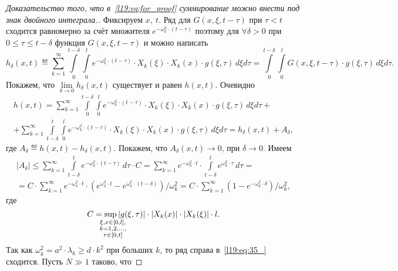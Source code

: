 \begin{proof}[Доказательство того, что в~\eqref{l19:eq:for_proof} суммирование можно внести под знак двойного интеграла.] Фиксируем $x,\ t$. Ряд для $G(x,\xi,t-\tau)$ при $\tau<t$ сходится равномерно за счёт множителя $\displaystyle e^{-\omega_k^2\cdot(t-\tau)}$ поэтому для $\forall\delta>0$ при $0\leqslant\tau\leqslant t-\delta$ функция $G(x,\xi,t-\tau)$ и можно написать
	\begin{equation*}
		h_{\delta}(x,t)\eqdef\sum\limits_{k=1}^{\infty}\int\limits_0^{t-\delta}\int\limits_0^l e^{-\omega_k^2\cdot(t-\tau)}\cdot X_k(\xi)\cdot X_k(x)\cdot g(\xi,\tau)\,d\xi d\tau=\int\limits_0^{t-\delta}\int\limits_0^l G(x,\xi,t-\tau)\cdot g(\xi,\tau)\,d\xi d\tau.
	\end{equation*}
	Покажем, что $\displaystyle\lim\limits_{\delta\to0}h_{\delta}(x,t)$ существует и равен $h(x,t)$. Очевидно 
	\begin{multline}\label{l19:eq:34_}
		h(x,t)=	\sum\limits_{k=1}^{\infty}\int\limits_0^{t-\delta}\int\limits_0^l e^{-\omega_k^2\cdot(t-\tau)}\cdot X_k(\xi)\cdot X_k(x)\cdot g(\xi,\tau)\,d\xi d\tau+\\
		+\sum\limits_{k=1}^{\infty}\int\limits_{t-\delta}^t\int\limits_0^l e^{-\omega_k^2\cdot(t-\tau)}\cdot X_k(\xi)\cdot X_k(x)\cdot g(\xi,\tau)\,d\xi d\tau=h_{\delta}(x,t)+A_{\delta},
	\end{multline}
	где $A_{\delta}\eqdef h(x,t)-h_{\delta}(x,t)$. Покажем, что $A_{\delta}(x,t)\to0$, при $\delta\to0$. Имеем
	\begin{multline}
		\label{l19:eq:35_}
		|A_{\delta}|\leqslant\sum\limits_{k=1}^{\infty}\int\limits_{t-\delta}^t e^{-\omega_k^2\cdot(t-\tau)}\,d\tau\cdot C=\sum\limits_{k=1}^{\infty}e^{-\omega_k^2\cdot t}\cdot\int\limits_{t-\delta}^t e^{\omega_k^2\cdot\tau}\,d\tau=\\
		=C\cdot\sum\limits_{k=1}^{\infty}e^{-\omega_k^2\cdot t}\cdot\left(e^{\omega_k^2\cdot t}-e^{\omega_k^2\cdot(t-\delta)}\right)\Big/\omega_k^2=C\cdot\sum\limits_{k=1}^{\infty}\left(1-e^{-\omega_k^2\cdot\delta}\right)\Big/\omega_k^2,
	\end{multline}	
	где 
	\begin{equation*}
		C=\sup\limits_{\lefteqn{\scriptstyle\substack{\xi,x\in[0,l],\\ k=1,2,\ldots,\\ \tau\in[0,t]}}}|g(\xi,\tau)|\cdot|X_k(x)|\cdot|X_k(\xi)|\cdot l.
	\end{equation*}
	Так как $\omega_k^2=a^2\cdot\lambda_k\geqslant d\cdot k^2$ при больших $k$, то ряд справа в~\eqref{l19:eq:35_} сходится. Пусть $N\gg1$ таково, что 

\end{proof}
